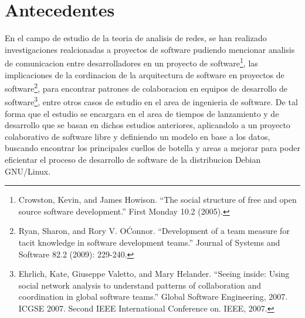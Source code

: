 \documentclass[12pt]{report}
\begin{document}
\chapter*{Antecedentes}
En el campo de estudio de la teoria de analisis de redes, se han
realizado investigaciones realcionadas a proyectos de software
pudiendo mencionar analisis de comunicacion entre desarrolladores en
un proyecto de software\footnote{Crowston, Kevin, and James Howison.
  ``The social structure of free and open source software
  development.''  First Monday 10.2 (2005).}, las implicaciones de la
cordinacion de la arquitectura de software en proyectos de
software\footnote{Ryan, Sharon, and Rory V. O\'Connor. ``Development
  of a team measure for tacit knowledge in software development
  teams.'' Journal of Systems and Software 82.2 (2009): 229-240.},
para encontrar patrones de colaboracion en equipos de desarrollo de
software\footnote{Ehrlich, Kate, Giuseppe Valetto, and Mary
  Helander. ``Seeing inside: Using social network analysis to
  understand patterns of collaboration and coordination in global
  software teams.'' Global Software Engineering, 2007. ICGSE
  2007. Second IEEE International Conference on. IEEE, 2007.}, entre
otros casos de estudio en el area de ingenieria de software. De tal
forma que el estudio se encargara en el area de tiempos de lanzamiento
y de desarrollo que se basan en dichos estudios anteriores,
aplicandolo a un proyecto colaborativo de software libre y definiendo
un modelo en base a los datos, buscando encontrar los principales
cuellos de botella y areas a mejorar para poder eficientar el proceso
de desarrollo de software de la distribucion Debian GNU/Linux.
\end{document}
